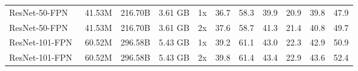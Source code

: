 \documentclass{article}
\begin{document}
\begin{table*}
{\begin{tabular}{lrrrrrrrrrr}
        ResNet-50-FPN~\cite{wang2020hrnet}  \hspace{-10pt} &  41.53M & 216.70B &  3.61 GB & \hspace{-6pt} 1x \hspace{-5pt} & 36.7 &      58.3 &      39.9 &     20.9 &     39.8 &     47.9 \\
        ResNet-50-FPN~\cite{wang2020hrnet}  \hspace{-10pt} &  41.53M & 216.70B &  3.61 GB & \hspace{-6pt} 2x \hspace{-5pt} & 37.6 &      58.7 &      41.3 &     21.4 &     40.8 &     49.7 \\
        ResNet-101-FPN~\cite{wang2020hrnet} \hspace{-10pt} &  60.52M & 296.58B &  5.43 GB & \hspace{-6pt} 1x \hspace{-5pt} & 39.2 &      61.1 &      43.0 &     22.3 &     42.9 &     50.9 \\
        ResNet-101-FPN~\cite{wang2020hrnet} \hspace{-10pt} &  60.52M & 296.58B &  5.43 GB & \hspace{-6pt} 2x \hspace{-5pt} & 39.8 &      61.4 &      43.4 &     22.9 &     43.6 &     52.4 \\
\bottomrule
    \end{tabular}
    }
    \label{tab:cocofrcnn}
\end{table*}
\end{document}
